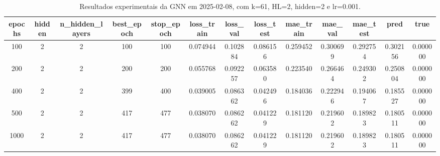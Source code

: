 \begin{table}[h]
\centering
\caption{Resultados experimentais da GNN em 2025-02-08, com k=61, HL=2, hidden=2 e lr=0.001.}
\label{tab:gnn_results_k61_hl2_h2_d20250208}
\begin{tabular}{ccccccccccccc}
\toprule
epochs & hidden & n\_hidden\_layers & best\_epoch & stop\_epoch & loss\_train & loss\_val & loss\_test & mae\_train & mae\_val & mae\_test & pred & true \\
\midrule
100 & 2 & 2 & 100 & 100 & 0.074944 & 0.102884 & 0.086156 & 0.259452 & 0.300699 & 0.292754 & 0.302156 & 0.000000 \\
200 & 2 & 2 & 200 & 200 & 0.055768 & 0.092257 & 0.063580 & 0.223540 & 0.266464 & 0.249302 & 0.250804 & 0.000000 \\
400 & 2 & 2 & 399 & 400 & 0.039005 & 0.086362 & 0.042496 & 0.184036 & 0.222946 & 0.194067 & 0.185527 & 0.000000 \\
500 & 2 & 2 & 417 & 477 & 0.038070 & 0.086262 & 0.041229 & 0.181120 & 0.219602 & 0.189823 & 0.180511 & 0.000000 \\
1000 & 2 & 2 & 417 & 477 & 0.038070 & 0.086262 & 0.041229 & 0.181120 & 0.219602 & 0.189823 & 0.180511 & 0.000000 \\
\bottomrule
\end{tabular}
\end{table}
